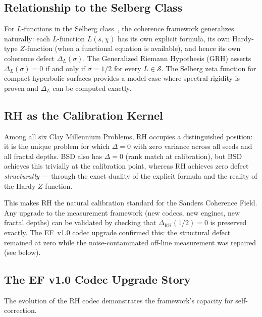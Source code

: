 \documentclass[11pt]{article}
\theoremstyle{remark}
\begin{document}
\subsection{Relationship to the Selberg Class}

For $L$-functions in the Selberg class~\cite{Selberg}, the coherence framework
generalizes naturally: each $L$-function $L(s,\chi)$ has its own explicit formula,
its own Hardy-type $Z$-function (when a functional equation is available), and hence
its own coherence defect $\Delta_L(\sigma)$.
The Generalized Riemann Hypothesis (GRH) asserts $\Delta_L(\sigma)=0$ if and only if
$\sigma=1/2$ for every $L\in\mathcal{S}$.
The Selberg zeta function for compact hyperbolic surfaces provides a model case where
spectral rigidity is proven and $\Delta_L$ can be computed exactly.

\subsection{RH as the Calibration Kernel}
\label{subsec:disc-calibration}

Among all six Clay Millennium Problems, RH occupies a distinguished position: it is
the unique problem for which $\Delta = 0$ with zero variance across all seeds and all
fractal depths.
BSD also has $\Delta = 0$ (rank match at calibration), but BSD achieves this trivially
at the calibration point, whereas RH achieves zero defect \emph{structurally} ---
through the exact duality of the explicit formula and the reality of the Hardy
$Z$-function.

This makes RH the natural calibration standard for the Sanders Coherence Field.
Any upgrade to the measurement framework (new codecs, new engines, new fractal
depths) can be validated by checking that $\Delta_{\mathrm{RH}}(1/2) = 0$ is
preserved exactly.
The EF~v1.0 codec upgrade confirmed this: the structural defect remained at zero
while the noise-contaminated off-line measurement was repaired (see below).

\subsection{The EF v1.0 Codec Upgrade Story}
\label{subsec:disc-ef-codec}

The evolution of the RH codec demonstrates the framework's capacity for self-correction.
\end{document}
